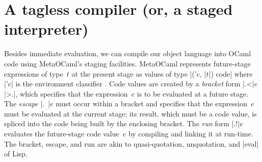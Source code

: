 \begin{comment}
\begin{code}
module EX1(S: Symantics) = struct
 open S
 let tfix () = app (fix (fun self -> self)) (int 1)
end;;
let module E =EX1(R) in E.tfix ();;
let module E =EX1(L) in E.tfix ();;
\end{code}
\end{comment}

\section{A tagless compiler (or, a staged interpreter)}\label{compiler}
Besides immediate evaluation, we can compile our object language
into OCaml code using MetaOCaml's staging facilities. MetaOCaml
represents future-stage expressions of type~$t$ at the
present stage as values of type |('c, |$t$|) code| where |'c| is the
environment classifier \cite{WalidPOPL03,calcagno-ml-like}. Code values are created
by a \emph{bracket} form |.<|$e$|>.|, which specifies that the expression~$e$ is to be
evaluated at a future stage. The \emph{escape} |.~|$e$ must occur
within a bracket and specifies that the expression~$e$ must be evaluated
at the current stage; its result, which must be a code value, is
spliced into the code being built by the enclosing bracket. The \emph{run} form |.!|$e$ evaluates
the future-stage code value~$e$ by compiling and linking it at run-time.
The bracket, escape, and run are akin to
quasi-quotation, unquotation, and |eval| of Lisp.

